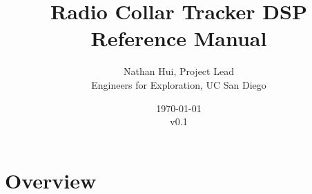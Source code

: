 \documentclass{report}
\title{Radio Collar Tracker DSP Reference Manual}
\author{Nathan Hui, Project Lead\\Engineers for Exploration, UC San Diego}
\date{\today\\v0.1}
\begin{document}
	\maketitle
	\tableofcontents
	\listoffigures
	\listoftables
	\chapter{Overview}
	\appendix
	\printglossaries
\end{document}
